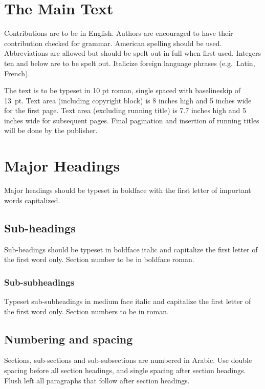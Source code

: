 \documentclass{ws-ijcga}
\begin{document}
\section{The Main Text}

Contributions are to be in English. Authors are encouraged to
have their contribution checked for grammar. American spelling
should be used. Abbreviations are allowed but should be spelt
out in full when first used. Integers ten and below are to be
spelt out. Italicize foreign language phrases (e.g.~Latin,
French).

The text is to be typeset in 10 pt roman, single spaced
with baselineskip of 13~pt. Text area (including copyright block)  
is 8 inches high and 5 inches wide for the first page.  
Text area (excluding running title) is 7.7 inches high and 
5 inches wide for subsequent pages.  Final pagination and 
insertion of running titles will be done by the publisher.

\section{Major Headings}

Major headings should be typeset in boldface with the first
letter of important words capitalized.

\subsection{Sub-headings}

Sub-headings should be typeset in boldface italic and capitalize
the first letter of the first word only. Section number to be in
boldface roman.

\subsubsection{Sub-subheadings}

Typeset sub-subheadings in medium face italic and capitalize the
first letter of the first word only. Section numbers to be in
roman.

\subsection{Numbering and spacing}

Sections, sub-sections and sub-subsections are numbered in
Arabic.  Use double spacing before all section headings, and
single spacing after section headings. Flush left all paragraphs
that follow after section headings.
\end{document}
